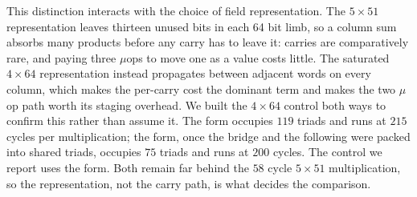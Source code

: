 This distinction interacts with the choice of field representation.
The $5\times51$ representation leaves thirteen unused bits in each 64 bit limb,
so a column sum absorbs many products before any carry has to leave it: carries
are comparatively rare, and paying three $\mu$ops to move one as a value costs
little.
The saturated $4\times64$ representation instead propagates between adjacent
words on every column, which makes the per-carry cost the dominant term and
makes the two $\mu$op path worth its  staging overhead.
We built the $4\times64$ control both ways to confirm this rather than assume
it.
The  form occupies $119$ triads and runs at $215$ cycles per
multiplication; the  form, once the bridge and the following
 were packed into shared triads, occupies $75$ triads and runs at
$200$ cycles.
The control we report uses the  form.
Both remain far behind the $58$ cycle $5\times51$ multiplication, so the
representation, not the carry path, is what decides the comparison.
